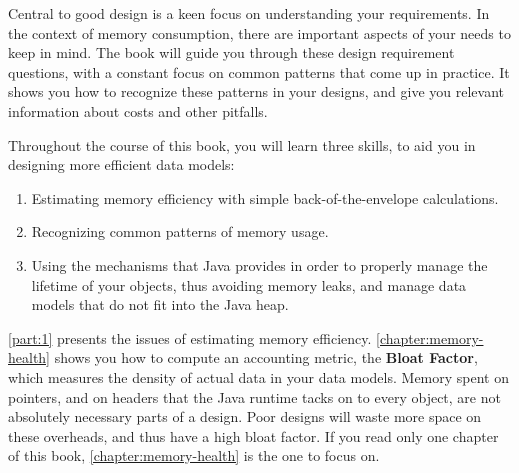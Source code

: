 
Central to good design is a keen focus on understanding your requirements.
In the context of memory consumption, there are important aspects of your needs
to keep in mind.   The book will guide you through these design requirement questions,
with a constant focus on common patterns that come up in practice. It shows you
how to recognize these patterns in your designs, and give you relevant
information about costs and other pitfalls.

Throughout the course of this book, you will learn three skills, to aid you in
designing more efficient data models:
\begin{enumerate}
  \item Estimating memory efficiency with simple back-of-the-envelope
  calculations.
  \item Recognizing common patterns of memory usage.
  \item Using the mechanisms that Java provides in order to properly manage the
  lifetime of your objects, thus avoiding memory leaks, and manage data models
  that do not fit into the Java heap.
\end{enumerate} 



\autoref{part:1} presents the issues of estimating memory efficiency.
\autoref{chapter:memory-health} shows you how to compute an accounting metric,
the \textbf{Bloat Factor}, which measures the density of actual data in your
data models. Memory spent on pointers, and on headers that the Java runtime
tacks on to every object, are not absolutely necessary parts of a design. Poor
designs will waste more space on these overheads, and thus have a high bloat
factor. If you read only one chapter of this book,
\autoref{chapter:memory-health} is the one to focus on.

